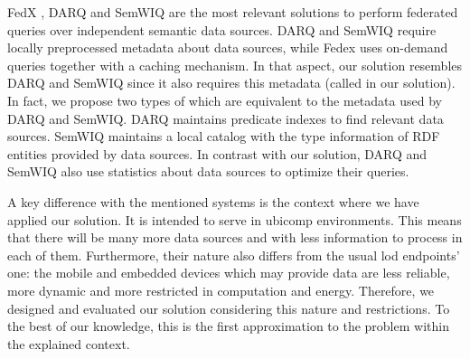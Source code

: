 \bigskip


FedX \citep{schwarte_fedx_federation2011,schwarte_fedx_optimization_2011}, DARQ \citep{quilitz_querying_2008} and SemWIQ \citep{langegger_semantic_2008} are the most relevant solutions to perform federated queries over independent semantic data sources.
DARQ and SemWIQ require locally preprocessed metadata about data sources, while Fedex uses on-demand queries together with a caching mechanism. %
In that aspect, our solution resembles DARQ and SemWIQ since it also requires this metadata (called \clues{} in our solution).
In fact, we propose two types of \clues{} which are equivalent to the metadata used by DARQ and SemWIQ.
DARQ maintains predicate indexes to find relevant data sources.
SemWIQ maintains a local catalog with the type information of RDF entities provided by data sources. %
In contrast with our solution, DARQ and SemWIQ also use statistics about data sources to optimize their queries.


A key difference with the mentioned systems is the context where we have applied our solution.
It is intended to serve in \ac{ubicomp} environments.
This means that there will be many more data sources and with less information to process in each of them.
Furthermore, their nature also differs from the usual \ac{lod} endpoints' one: the mobile and embedded devices which may provide data are less reliable, more dynamic and more restricted in computation and energy.
Therefore, we designed and evaluated our solution considering this nature and restrictions.
To the best of our knowledge, this is the first approximation to the problem within the explained context.


